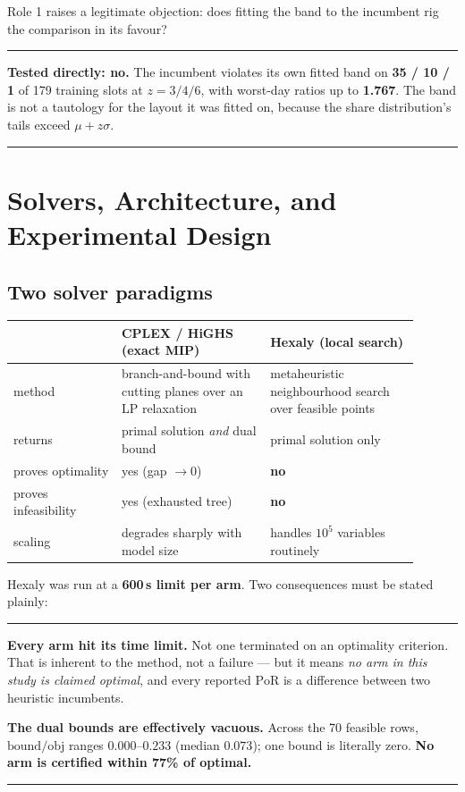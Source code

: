 \documentclass[11pt,a4paper]{article}
\newenvironment{keybox}
  {\par\medskip\noindent\rule{\linewidth}{0.9pt}\par\nobreak\smallskip\ignorespaces}
  {\par\smallskip\nobreak\noindent\rule{\linewidth}{0.9pt}\par\medskip}
\newcommand{\PoR}{\mathrm{PoR}}
\begin{document}
Role 1 raises a legitimate objection: does fitting the band to the incumbent
rig the comparison in its favour?

\begin{keybox}
\textbf{Tested directly: no.} The incumbent violates its own fitted band on
\textbf{35 / 10 / 1} of 179 training slots at $z=3/4/6$, with worst-day ratios
up to \textbf{1.767}. The band is not a tautology for the layout it was fitted
on, because the share distribution's tails exceed $\mu+z\sigma$.
\end{keybox}

\section{Solvers, Architecture, and Experimental Design}

\subsection{Two solver paradigms}

\begin{center}
\begin{tabular}{p{0.24\linewidth}p{0.33\linewidth}p{0.33\linewidth}}
\toprule
 & \textbf{CPLEX / HiGHS (exact MIP)} & \textbf{Hexaly (local search)} \\
\midrule
method & branch-and-bound with cutting planes over an LP relaxation & metaheuristic neighbourhood search over feasible points \\
returns & primal solution \emph{and} dual bound & primal solution only \\
proves optimality & yes (gap $\to0$) & \textbf{no} \\
proves infeasibility & yes (exhausted tree) & \textbf{no} \\
scaling & degrades sharply with model size & handles $10^5$ variables routinely \\
\bottomrule
\end{tabular}
\end{center}

Hexaly was run at a \textbf{600\,s limit per arm}. Two consequences must be
stated plainly:

\begin{keybox}
\textbf{Every arm hit its time limit.} Not one terminated on an optimality
criterion. That is inherent to the method, not a failure --- but it means
\emph{no arm in this study is claimed optimal}, and every reported $\PoR$ is a
difference between two heuristic incumbents.

\textbf{The dual bounds are effectively vacuous.} Across the 70 feasible rows,
$\text{bound}/\text{obj}$ ranges $0.000$--$0.233$ (median $0.073$); one bound is
literally zero. \textbf{No arm is certified within 77\% of optimal.}
\end{keybox}
\end{document}
